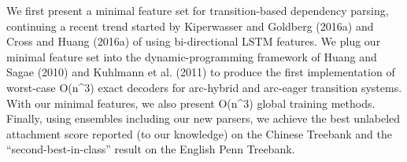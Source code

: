 We first present a minimal feature set for transition-based dependency parsing, continuing a recent trend started by Kiperwasser and Goldberg (2016a) and Cross and Huang (2016a) of using bi-directional LSTM features. We plug our minimal feature set into the dynamic-programming framework of Huang and Sagae (2010) and Kuhlmann et al. (2011) to produce the first implementation of worst-case O(n^3) exact decoders for arc-hybrid and arc-eager transition systems. With our minimal features, we also present O(n^3) global training methods. Finally, using ensembles including our new parsers, we achieve the best unlabeled attachment score reported (to our knowledge) on the Chinese Treebank and the ``second-best-in-class'' result on the English Penn Treebank.
